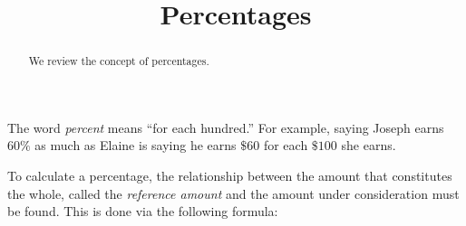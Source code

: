 \documentclass{ximera}
\title{Percentages}
\begin{document}
\begin{abstract}
We review the concept of percentages.
\end{abstract}
\maketitle


The word \emph{percent} means ``for each hundred.'' For example, saying Joseph earns $60\%$ as much as Elaine is saying he earns $\$60$ for each $\$100$ she earns.

To calculate a percentage, the relationship between the amount that constitutes the whole, called the \emph{reference amount} and the amount under consideration must be found. This is done via the following formula:
\end{document}
